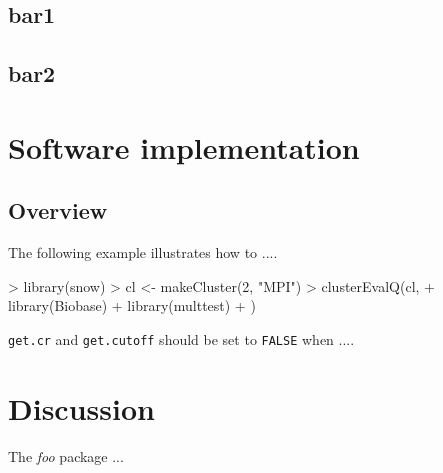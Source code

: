 \documentclass[11pt]{article}
\newcommand{\Rpackage}[1]{\textit{#1}}
\newcommand{\Robject}[1]{\texttt{#1}}
\begin{document}
\subsection{bar1}
\label{anal:mult:s:framework}


\subsection{bar2}
\label{anal:mult:s:nullDistn}

 
\section{Software implementation}
\label{anal:mult:s:software}

\subsection{Overview}

The following example illustrates how to ....

\begin{Schunk}
\begin{Sinput}
> library(snow)
> cl <- makeCluster(2, "MPI")
> clusterEvalQ(cl, {
+     library(Biobase)
+     library(multtest)
+ })
\end{Sinput}
\end{Schunk}

\Robject{get.cr} and \Robject{get.cutoff} should be set to
\Robject{FALSE} when ....

\section{Discussion}
\label{anal:mult:s:disc}

The \Rpackage{foo} package ...





\end{document}
